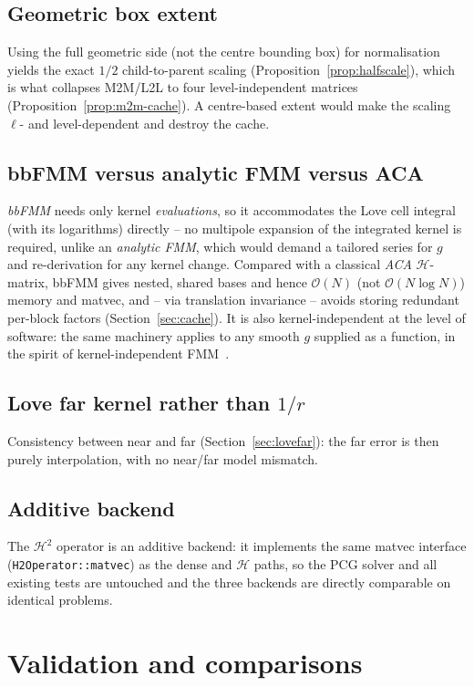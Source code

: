 \documentclass[11pt,a4paper]{article}
\newcommand{\Order}{\mathcal{O}}
\newcommand{\Htwo}{\mathcal{H}^2}
\newcommand{\Hmat}{\mathcal{H}}
\newcommand{\code}[1]{\texttt{#1}}
\theoremstyle{definition}
\theoremstyle{remark}
\begin{document}
\subsection{Geometric box extent}
Using the full geometric side (not the centre bounding box) for normalisation
yields the exact $1/2$ child-to-parent scaling (Proposition~\ref{prop:halfscale}),
which is what collapses M2M/L2L to four level-independent matrices
(Proposition~\ref{prop:m2m-cache}). A centre-based extent would make the scaling
$\ell$- and level-dependent and destroy the cache.

\subsection{bbFMM versus analytic FMM versus ACA}
\emph{bbFMM} needs only kernel \emph{evaluations}, so it accommodates the Love
cell integral (with its logarithms) directly -- no multipole expansion of the
integrated kernel is required, unlike an \emph{analytic FMM}, which would demand
a tailored series for $g$ and re-derivation for any kernel change. Compared with
a classical \emph{ACA} $\Hmat$-matrix, bbFMM gives nested, shared bases and
hence $\Order(N)$ (not $\Order(N\log N)$) memory and matvec, and -- via
translation invariance -- avoids storing redundant per-block factors
(Section~\ref{sec:cache}). It is also kernel-independent at the level of
software: the same machinery applies to any smooth $g$ supplied as a function,
in the spirit of kernel-independent FMM~\cite{Ying2004,FongDarve2009}.

\subsection{Love far kernel rather than $1/r$}
Consistency between near and far (Section~\ref{sec:lovefar}): the far error is
then purely interpolation, with no near/far model mismatch.

\subsection{Additive backend}
The $\Htwo$ operator is an additive backend: it implements the same
matvec interface (\code{H2Operator::matvec}) as the dense and $\Hmat$ paths, so
the PCG solver and all existing tests are untouched and the three backends are
directly comparable on identical problems.

\section{Validation and comparisons}
\label{sec:valid}
\end{document}
